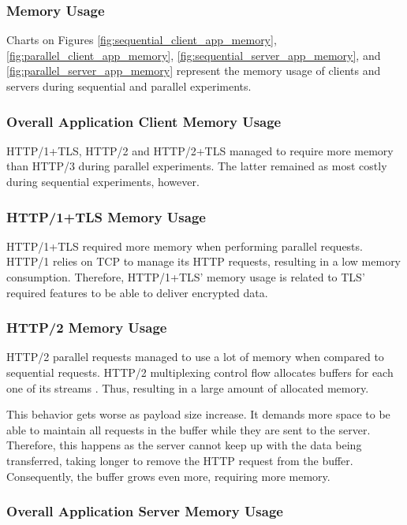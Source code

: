 \subsubsection{Memory Usage}

Charts on Figures \ref{fig:sequential_client_app_memory}, \ref{fig:parallel_client_app_memory}, \ref{fig:sequential_server_app_memory}, and \ref{fig:parallel_server_app_memory} represent the memory usage of clients and servers during sequential and parallel experiments.

\subsubsection*{Overall Application Client Memory Usage}

HTTP/1+TLS, HTTP/2 and HTTP/2+TLS managed to require more memory than HTTP/3 during parallel experiments. The latter remained as most costly during sequential experiments, however.

\subsubsection*{HTTP/1+TLS Memory Usage}

HTTP/1+TLS required more memory when performing parallel requests. HTTP/1 relies on TCP to manage its HTTP requests, resulting in a low memory consumption. Therefore, HTTP/1+TLS' memory usage is related to TLS' required features to be able to deliver encrypted data.

\subsubsection*{HTTP/2 Memory Usage}

HTTP/2 parallel requests managed to use a lot of memory when compared to sequential requests. HTTP/2 multiplexing control flow allocates buffers for each one of its streams \cite{rfc7540}. Thus, resulting in a large amount of allocated memory.

This behavior gets worse as payload size increase. It demands more space to be able to maintain all requests in the buffer while they are sent to the server. Therefore, this happens as the server cannot keep up with the data being transferred, taking longer to remove the HTTP request from the buffer. Consequently, the buffer grows even more, requiring more memory.

\subsubsection*{Overall Application Server Memory Usage}

